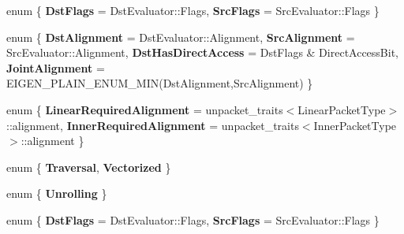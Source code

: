 \begin{DoxyCompactItemize}
\item 
\mbox{\label{struct_eigen_1_1internal_1_1copy__using__evaluator__traits_ae94641f742a3c62828421130e2137551}} 
enum \{ {\bfseries Dst\+Flags} = Dst\+Evaluator\+:\+:Flags, 
{\bfseries Src\+Flags} = Src\+Evaluator\+:\+:Flags
 \}
\item 
\mbox{\label{struct_eigen_1_1internal_1_1copy__using__evaluator__traits_ac9689e6ad07ac1d604511fe849840ef5}} 
enum \{ {\bfseries Dst\+Alignment} = Dst\+Evaluator\+:\+:Alignment, 
{\bfseries Src\+Alignment} = Src\+Evaluator\+:\+:Alignment, 
{\bfseries Dst\+Has\+Direct\+Access} = Dst\+Flags \& Direct\+Access\+Bit, 
{\bfseries Joint\+Alignment} = E\+I\+G\+E\+N\+\_\+\+P\+L\+A\+I\+N\+\_\+\+E\+N\+U\+M\+\_\+\+M\+IN(Dst\+Alignment,Src\+Alignment)
 \}
\item 
\mbox{\label{struct_eigen_1_1internal_1_1copy__using__evaluator__traits_a5799f7b34a8e72ecab7cdf960db24121}} 
enum \{ {\bfseries Linear\+Required\+Alignment} = unpacket\+\_\+traits$<$Linear\+Packet\+Type$>$\+:\+:alignment, 
{\bfseries Inner\+Required\+Alignment} = unpacket\+\_\+traits$<$Inner\+Packet\+Type$>$\+:\+:alignment
 \}
\item 
\mbox{\label{struct_eigen_1_1internal_1_1copy__using__evaluator__traits_a7f234eb52a5f84b946457f4fe0cbc6e3}} 
enum \{ {\bfseries Traversal}, 
{\bfseries Vectorized}
 \}
\item 
\mbox{\label{struct_eigen_1_1internal_1_1copy__using__evaluator__traits_a5096ec12f9a35510f6e75eb1227743e8}} 
enum \{ {\bfseries Unrolling}
 \}
\item 
\mbox{\label{struct_eigen_1_1internal_1_1copy__using__evaluator__traits_ab584c123055606543b4f271a34a6611a}} 
enum \{ {\bfseries Dst\+Flags} = Dst\+Evaluator\+:\+:Flags, 
{\bfseries Src\+Flags} = Src\+Evaluator\+:\+:Flags
 \}
\item 
\mbox{\label{struct_eigen_1_1internal_1_1copy__using__evaluator__traits_a321c9bf3e6a50655c800404d05aafed2}} 

\end{DoxyCompactItemize}
